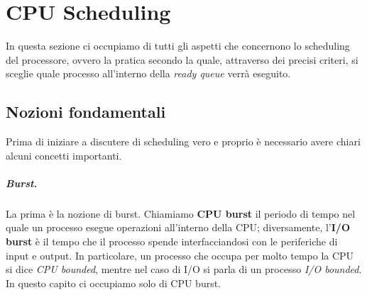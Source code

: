 \pagebreak
\chapter{CPU Scheduling} \label{CPU scheduling}
In questa sezione ci occupiamo di tutti gli aspetti che concernono lo scheduling del processore, ovvero la pratica secondo la quale, attraverso dei precisi criteri, si sceglie quale processo all'interno della \textit{ready queue} verrà eseguito.

\section{Nozioni fondamentali}
Prima di iniziare a discutere di scheduling vero e proprio è necessario avere chiari alcuni concetti importanti.

\paragraph{Burst.}
La prima è la nozione di burst. Chiamiamo \textbf{CPU burst} il periodo di tempo nel quale un processo esegue operazioni all'interno della CPU; diversamente, l'\textbf{I/O burst} è il tempo che il processo spende interfacciandosi con le periferiche di input e output. In particolare, un processo che occupa per molto tempo la CPU si dice \textit{CPU bounded}, mentre nel caso di I/O si parla di un processo \textit{I/O bounded}. In questo capito ci occupiamo solo di CPU burst.
% 
